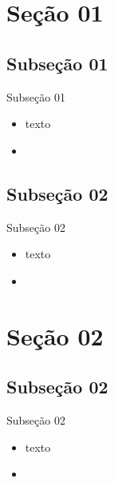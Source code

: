 \documentclass[aspectratio=169, 9pt]{beamer}
\begin{document}




\section{Seção 01}

\subsection[]{Subseção 01}

\begin{frame}{Subseção 01}
	\begin{itemize}[<+->]
		\item texto
		\item 
	\end{itemize}
\end{frame}


\subsection[]{Subseção 02}

\begin{frame}{Subseção 02}
	\begin{itemize}[<+->]
		\item texto
		\item 
	\end{itemize}
\end{frame}



\section{Seção 02}

\subsection[]{Subseção 02}

\begin{frame}{Subseção 02}
	\begin{itemize}[<+->]
		\item texto
		\item 
	\end{itemize}
\end{frame}



\end{document}
